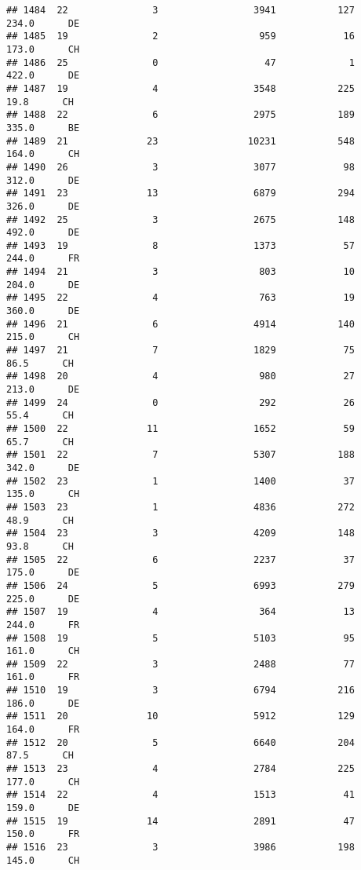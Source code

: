 \documentclass[
]{article}
\begin{document}
\begin{verbatim}
## 1484  22               3                 3941           127    234.0      DE
## 1485  19               2                  959            16    173.0      CH
## 1486  25               0                   47             1    422.0      DE
## 1487  19               4                 3548           225     19.8      CH
## 1488  22               6                 2975           189    335.0      BE
## 1489  21              23                10231           548    164.0      CH
## 1490  26               3                 3077            98    312.0      DE
## 1491  23              13                 6879           294    326.0      DE
## 1492  25               3                 2675           148    492.0      DE
## 1493  19               8                 1373            57    244.0      FR
## 1494  21               3                  803            10    204.0      DE
## 1495  22               4                  763            19    360.0      DE
## 1496  21               6                 4914           140    215.0      CH
## 1497  21               7                 1829            75     86.5      CH
## 1498  20               4                  980            27    213.0      DE
## 1499  24               0                  292            26     55.4      CH
## 1500  22              11                 1652            59     65.7      CH
## 1501  22               7                 5307           188    342.0      DE
## 1502  23               1                 1400            37    135.0      CH
## 1503  23               1                 4836           272     48.9      CH
## 1504  23               3                 4209           148     93.8      CH
## 1505  22               6                 2237            37    175.0      DE
## 1506  24               5                 6993           279    225.0      DE
## 1507  19               4                  364            13    244.0      FR
## 1508  19               5                 5103            95    161.0      CH
## 1509  22               3                 2488            77    161.0      FR
## 1510  19               3                 6794           216    186.0      DE
## 1511  20              10                 5912           129    164.0      FR
## 1512  20               5                 6640           204     87.5      CH
## 1513  23               4                 2784           225    177.0      CH
## 1514  22               4                 1513            41    159.0      DE
## 1515  19              14                 2891            47    150.0      FR
## 1516  23               3                 3986           198    145.0      CH

\end{verbatim}
\end{document}

